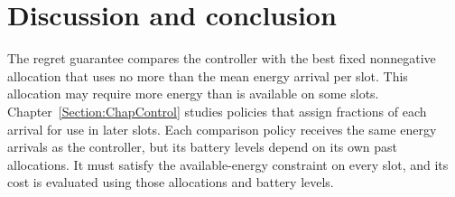 \section{Discussion and conclusion}
\label{sec:energy:conclusion}

The regret guarantee compares the controller with the best fixed
nonnegative allocation that uses no more than the mean energy arrival per
slot. This allocation may require more energy than is available on some
slots. Chapter~\ref{Section:ChapControl} studies
policies that assign fractions of each arrival for use in later slots.
Each comparison policy receives the same energy arrivals as the controller,
but its battery levels depend on its own past allocations. It must satisfy
the available-energy constraint on every slot, and its cost is evaluated
using those allocations and battery levels.
